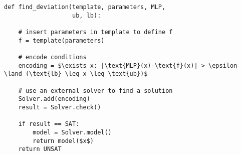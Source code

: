 \begin{lstlisting}[caption={Method to find a deviation between the function and the MLP}, label=lst:nn_verify, mathescape=true]
def find_deviation(template, parameters, MLP, 
                   ub, lb):
    
    # insert parameters in template to define f
    f = template(parameters)
	
    # encode conditions
    encoding = $\exists x: |\text{MLP}(x)-\text{f}(x)| > \epsilon \land (\text{lb} \leq x \leq \text{ub})$
    
    # use an external solver to find a solution
    Solver.add(encoding)
    result = Solver.check()
    
    if result == SAT:
        model = Solver.model()
        return model($x$)
    return UNSAT
\end{lstlisting}